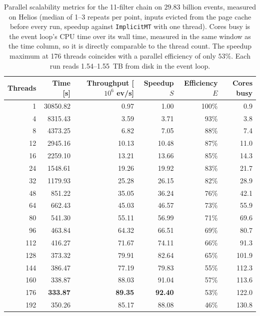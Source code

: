 \begin{table}[htbp]
\centering
\caption{Parallel scalability metrics for the 11-filter chain on $29.83$ billion events, measured on Helios (median of 1--3 repeats per point, inputs evicted from the page cache before every run, speedup against \texttt{ImplicitMT} with one thread). Cores busy is the event loop's CPU time over its wall time, measured in the same window as the time column, so it is directly comparable to the thread count. The speedup maximum at 176 threads coincides with a parallel efficiency of only $53\%$. Each run reads 1.54--1.55~TB from disk in the event loop.}
\label{tab:scalability-chain11}
\begin{tabular}{rrrrrr}
\toprule
Threads & Time [s] & Throughput [$10^6$ ev/s] & Speedup $S$ & Efficiency $E$ & Cores busy \\
\midrule
 1 & 30850.82 & 0.97 & 1.00 & 100\% & 0.9 \\
 4 & 8315.43 & 3.59 & 3.71 & 93\% & 3.8 \\
 8 & 4373.25 & 6.82 & 7.05 & 88\% & 7.4 \\
12 & 2945.16 & 10.13 & 10.48 & 87\% & 11.0 \\
16 & 2259.10 & 13.21 & 13.66 & 85\% & 14.3 \\
24 & 1548.61 & 19.26 & 19.92 & 83\% & 21.7 \\
32 & 1179.93 & 25.28 & 26.15 & 82\% & 28.9 \\
48 & 851.22 & 35.05 & 36.24 & 76\% & 42.1 \\
64 & 662.43 & 45.03 & 46.57 & 73\% & 55.9 \\
80 & 541.30 & 55.11 & 56.99 & 71\% & 69.6 \\
96 & 463.84 & 64.32 & 66.51 & 69\% & 80.7 \\
112 & 416.27 & 71.67 & 74.11 & 66\% & 91.3 \\
128 & 373.32 & 79.91 & 82.64 & 65\% & 101.9 \\
144 & 386.47 & 77.19 & 79.83 & 55\% & 112.3 \\
160 & 338.87 & 88.03 & 91.04 & 57\% & 113.6 \\
176 & \textbf{333.87} & \textbf{89.35} & \textbf{92.40} & 53\% & 122.0 \\
192 & 350.26 & 85.17 & 88.08 & 46\% & 130.8 \\
\bottomrule
\end{tabular}
\end{table}
